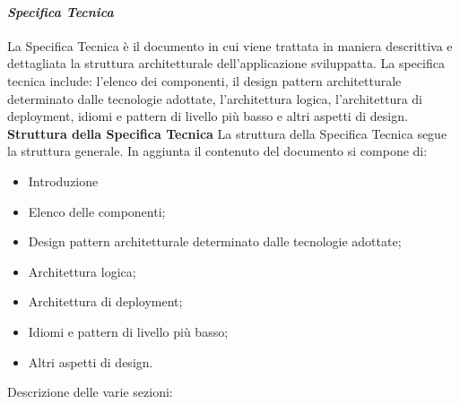 \paragraph{\textit{Specifica Tecnica}}
La Specifica Tecnica è il documento in cui viene trattata in maniera descrittiva e dettagliata la struttura architetturale dell'applicazione sviluppatta. 
La specifica tecnica include: l'elenco dei componenti, il design pattern architetturale determinato dalle tecnologie adottate, l'architettura logica, l'architettura di deployment, idiomi e pattern di livello più basso e altri aspetti di design.
\textbf{Struttura della Specifica Tecnica}
La struttura della Specifica Tecnica segue la struttura generale.
In aggiunta il contenuto del documento si compone di:
\begin{itemize}
	\item Introduzione
    \item Elenco delle componenti;
    \item Design pattern architetturale determinato dalle tecnologie adottate;
    \item Architettura logica;
	\item Architettura di deployment;
	\item Idiomi e pattern di livello più basso;
	\item Altri aspetti di design.
\end{itemize}
\noindent Descrizione delle varie sezioni:
